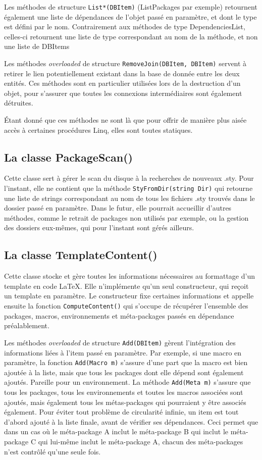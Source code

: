\documentclass[a4paper, oneside]{article}
\begin{document}
Les méthodes de structure \texttt{List*(DBItem)} (ListPackages par exemple)
retournent également une liste de dépendances de l'objet passé en
paramètre, et dont le type est défini par le nom. Contrairement aux
méthodes de type DependenciesList, celles-ci retournent une liste de
type correspondant au nom de la méthode, et non une liste de DBItems

Les méthodes \emph{overloaded} de structure \texttt{RemoveJoin(DBItem, DBItem)}
servent à retirer le lien potentiellement existant dans la base de
donnée entre les deux entités. Ces méthodes sont en particulier
utilisées lors de la destruction d'un objet, pour s'assurer que toutes
les connexions intermédiaires sont également détruites.


Étant donné que ces méthodes ne sont là que pour offrir de manière
plus aisée accès à certaines procédures Linq, elles sont toutes
statiques.
\subsection{La classe PackageScan()}
\label{sec:orgc588356}
Cette classe sert à gérer le scan du disque à la recherches de
nouveaux .sty. Pour l'instant, elle ne contient que la méthode
\texttt{StyFromDir(string Dir)} qui retourne une liste de strings
correspondant au nom de tous les fichiers .sty trouvés dans le dossier
passé en paramètre. Dans le futur, elle pourrait accueillir d'autres
méthodes, comme le retrait de packages non utilisés par exemple, ou la
gestion des dossiers eux-mêmes, qui pour l'instant sont gérés
ailleurs.
\subsection{La classe TemplateContent()}
\label{sec:org3067a49}
Cette classe stocke et gère toutes les informations nécessaires au
formattage d'un template en code \LaTeX{}. Elle n'implémente qu'un
seul constructeur, qui reçoit un template en paramètre. Le
constructeur fixe certaines informations et appelle ensuite la
fonction \texttt{ComputeContent()} qui s'occupe de récupérer l'ensemble des
packages, macros, environnements et méta-packages passés en dépendance
préalablement.

Les méthodes \emph{overloaded} de structure \texttt{Add(DBItem)} gèrent
l'intégration des informations liées à l'item passé en paramètre. Par
exemple, si une macro en paramètre, la fonction \texttt{Add(Macro m)}
s'assure d'une part que la macro est bien ajoutée à la liste, mais que
tous les packages dont elle dépend sont également ajoutés. Pareille
pour un environnement. La méthode \texttt{Add(Meta m)} s'assure que tous les
packages, tous les environnements et toutes les macros associées sont
ajoutés, mais également tous les métas-packages qui pourraient y être
associés également. Pour éviter tout problème de circularité infinie,
un item est tout d'abord ajouté à la liste finale, avant de vérifier
ses dépendances. Ceci permet que dans un cas où le méta-package A
inclut le méta-package B qui inclut le méta-package C qui lui-même
inclut le méta-package A, chacun des méta-packages n'est contrôlé
qu'une seule fois.
\end{document}
